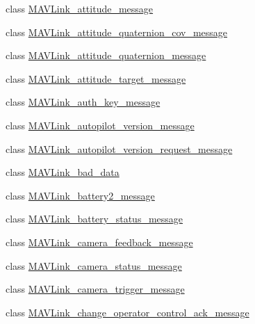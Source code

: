 \begin{DoxyCompactItemize}
\item 
class \hyperlink{classpymavlink_1_1dialects_1_1v10_1_1MAVLink__attitude__message}{M\+A\+V\+Link\+\_\+attitude\+\_\+message}
\item 
class \hyperlink{classpymavlink_1_1dialects_1_1v10_1_1MAVLink__attitude__quaternion__cov__message}{M\+A\+V\+Link\+\_\+attitude\+\_\+quaternion\+\_\+cov\+\_\+message}
\item 
class \hyperlink{classpymavlink_1_1dialects_1_1v10_1_1MAVLink__attitude__quaternion__message}{M\+A\+V\+Link\+\_\+attitude\+\_\+quaternion\+\_\+message}
\item 
class \hyperlink{classpymavlink_1_1dialects_1_1v10_1_1MAVLink__attitude__target__message}{M\+A\+V\+Link\+\_\+attitude\+\_\+target\+\_\+message}
\item 
class \hyperlink{classpymavlink_1_1dialects_1_1v10_1_1MAVLink__auth__key__message}{M\+A\+V\+Link\+\_\+auth\+\_\+key\+\_\+message}
\item 
class \hyperlink{classpymavlink_1_1dialects_1_1v10_1_1MAVLink__autopilot__version__message}{M\+A\+V\+Link\+\_\+autopilot\+\_\+version\+\_\+message}
\item 
class \hyperlink{classpymavlink_1_1dialects_1_1v10_1_1MAVLink__autopilot__version__request__message}{M\+A\+V\+Link\+\_\+autopilot\+\_\+version\+\_\+request\+\_\+message}
\item 
class \hyperlink{classpymavlink_1_1dialects_1_1v10_1_1MAVLink__bad__data}{M\+A\+V\+Link\+\_\+bad\+\_\+data}
\item 
class \hyperlink{classpymavlink_1_1dialects_1_1v10_1_1MAVLink__battery2__message}{M\+A\+V\+Link\+\_\+battery2\+\_\+message}
\item 
class \hyperlink{classpymavlink_1_1dialects_1_1v10_1_1MAVLink__battery__status__message}{M\+A\+V\+Link\+\_\+battery\+\_\+status\+\_\+message}
\item 
class \hyperlink{classpymavlink_1_1dialects_1_1v10_1_1MAVLink__camera__feedback__message}{M\+A\+V\+Link\+\_\+camera\+\_\+feedback\+\_\+message}
\item 
class \hyperlink{classpymavlink_1_1dialects_1_1v10_1_1MAVLink__camera__status__message}{M\+A\+V\+Link\+\_\+camera\+\_\+status\+\_\+message}
\item 
class \hyperlink{classpymavlink_1_1dialects_1_1v10_1_1MAVLink__camera__trigger__message}{M\+A\+V\+Link\+\_\+camera\+\_\+trigger\+\_\+message}
\item 
class \hyperlink{classpymavlink_1_1dialects_1_1v10_1_1MAVLink__change__operator__control__ack__message}{M\+A\+V\+Link\+\_\+change\+\_\+operator\+\_\+control\+\_\+ack\+\_\+message}

\end{DoxyCompactItemize}
